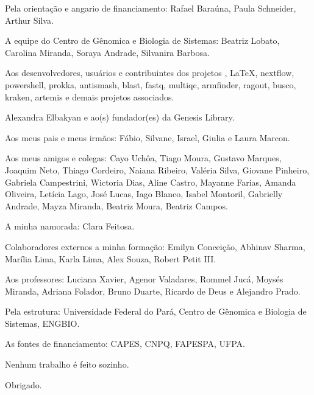 \begin{agradecimentos}
Pela orientação e angario de financiamento: Rafael Baraúna, Paula Schneider, Arthur Silva. 

A equipe do Centro de Gênomica e Biologia de Sistemas: Beatriz Lobato, Carolina Miranda, Soraya Andrade,
Silvanira Barbosa. 

Aos desenvolvedores, usuários e contribuintes dos projetos \abnTeX, \LaTeX, nextflow, powershell, 
prokka, antismash, blast, fastq, multiqc, armfinder, ragout, busco, kraken, artemis e demais projetos
associados.

Alexandra Elbakyan e ao(s) fundador(es) da Genesis Library.

Aos meus pais e meus irmãos: Fábio, Silvane, Israel, Giulia e Laura Marcon.

Aos meus amigos e colegas: Cayo Uchôa, Tiago Moura, Gustavo Marques, Joaquim Neto, Thiago Cordeiro, Naiana Ribeiro, 
Valéria Silva, Giovane Pinheiro, Gabriela Campestrini, Wictoria Dias, Aline Castro, Mayanne Farias, Amanda Oliveira, 
Letícia Lago, José Lucas, Iago Blanco, Isabel Montoril, Gabrielly Andrade, Mayza Miranda,
Beatriz Moura, Beatriz Campos. 

A minha namorada: Clara Feitosa.

Colaboradores externos a minha formação: Emilyn Conceição, Abhinav Sharma, Marília Lima, Karla Lima, Alex Souza, Robert Petit III.

Aos professores: Luciana Xavier, Agenor Valadares, Rommel Jucá, Moysés Miranda, Adriana Folador,
Bruno Duarte, Ricardo de Deus e Alejandro Prado.

Pela estrutura: Universidade Federal do Pará, Centro de Gênomica e Biologia de Sistemas, ENGBIO.

As fontes de financiamento: CAPES, CNPQ, FAPESPA, UFPA.


Nenhum trabalho é feito sozinho.


Obrigado.

\end{agradecimentos}
